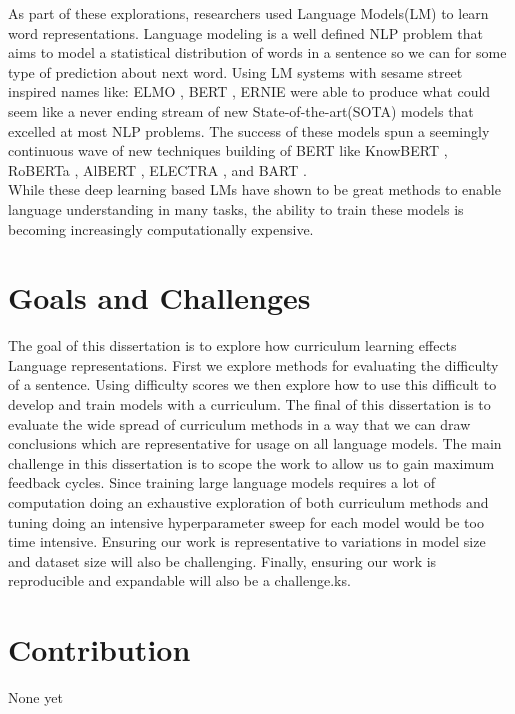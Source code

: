 As part of these explorations, researchers used Language Models(LM) to learn word representations. Language modeling is a well defined NLP problem that aims to model a statistical distribution of words in a sentence so we can for some type of prediction about next word. Using LM systems with sesame street inspired names like: ELMO \cite{Peters2019KnowledgeEC}, BERT \cite{Devlin2019BERTPO}, ERNIE \cite{Sun2019ERNIE2} were able to produce what could seem like a never ending stream of new State-of-the-art(SOTA) models that excelled at most NLP problems. The success of these models spun a seemingly continuous wave of new techniques building of BERT like KnowBERT \cite{Peters2019KnowledgeEC}, RoBERTa \cite{Liu2019RoBERTaAR}, AlBERT \cite{Lan2019ALBERTAL}, ELECTRA \cite{Clark2020ELECTRAPT}, and BART \cite{Lewis2019BARTDS}.  \\
While these deep learning based LMs have shown to be great methods to enable language understanding in many tasks, the ability to train these models is becoming increasingly computationally expensive. 
\section {Goals and Challenges}
The goal of this dissertation is to explore how curriculum learning effects Language representations. First we explore methods for evaluating the difficulty of a sentence. Using difficulty scores we then explore how to use this difficult to develop and train models with a curriculum. The final of this dissertation is to evaluate the wide spread of curriculum methods in a way that we can draw conclusions which are representative for usage on all language models.
The main challenge in this dissertation is to scope the work to allow us to gain maximum feedback cycles. Since training large language models requires a lot of computation doing an exhaustive exploration of both curriculum methods and tuning doing an intensive hyperparameter sweep for each model would be too time intensive. Ensuring our work is representative to variations in model size and dataset size will also be challenging. Finally, ensuring our work is reproducible and expandable will also be a challenge.ks. 
\section{Contribution}
None yet
